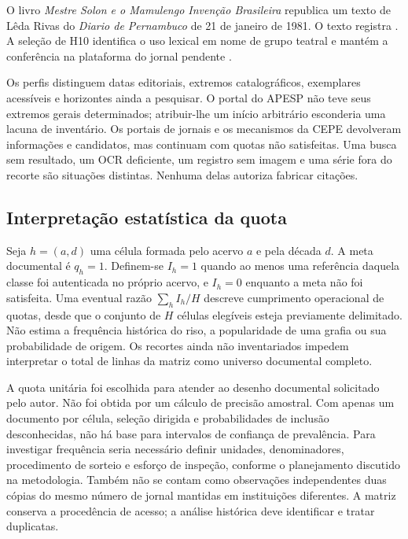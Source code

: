 O livro \textit{Mestre Solon e o Mamulengo Invenção Brasileira} republica um texto de Lêda Rivas do \textit{Diario de Pernambuco} de 21 de janeiro de 1981. O texto registra . A seleção de H10 identifica o uso lexical em nome de grupo teatral e mantém a conferência na plataforma do jornal pendente \cite{acervoD127}.

Os perfis distinguem datas editoriais, extremos catalográficos, exemplares acessíveis e horizontes ainda a pesquisar. O portal do APESP não teve seus extremos gerais determinados; atribuir-lhe um início arbitrário esconderia uma lacuna de inventário. Os portais de jornais e os mecanismos da CEPE devolveram informações e candidatos, mas continuam com quotas não satisfeitas. Uma busca sem resultado, um OCR deficiente, um registro sem imagem e uma série fora do recorte são situações distintas. Nenhuma delas autoriza fabricar citações.

\subsection{Interpretação estatística da quota}

Seja $h=(a,d)$ uma célula formada pelo acervo $a$ e pela década $d$. A meta documental é $q_h=1$. Definem-se $I_h=1$ quando ao menos uma referência daquela classe foi autenticada no próprio acervo, e $I_h=0$ enquanto a meta não foi satisfeita. Uma eventual razão $\sum_h I_h/H$ descreve cumprimento operacional de quotas, desde que o conjunto de $H$ células elegíveis esteja previamente delimitado. Não estima a frequência histórica do riso, a popularidade de uma grafia ou sua probabilidade de origem. Os recortes ainda não inventariados impedem interpretar o total de linhas da matriz como universo documental completo.

A quota unitária foi escolhida para atender ao desenho documental solicitado pelo autor. Não foi obtida por um cálculo de precisão amostral. Com apenas um documento por célula, seleção dirigida e probabilidades de inclusão desconhecidas, não há base para intervalos de confiança de prevalência. Para investigar frequência seria necessário definir unidades, denominadores, procedimento de sorteio e esforço de inspeção, conforme o planejamento discutido na metodologia. Também não se contam como observações independentes duas cópias do mesmo número de jornal mantidas em instituições diferentes. A matriz conserva a procedência de acesso; a análise histórica deve identificar e tratar duplicatas.

